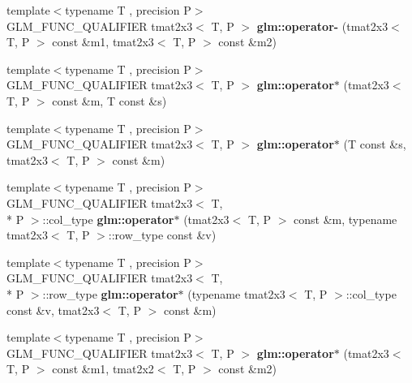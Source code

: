 \begin{DoxyCompactItemize}
\item 
\hypertarget{namespaceglm_a2a06e2f9118332e9be75b7d6e9b7810f}{{\footnotesize template$<$typename T , precision P$>$ }\\G\-L\-M\-\_\-\-F\-U\-N\-C\-\_\-\-Q\-U\-A\-L\-I\-F\-I\-E\-R tmat2x3$<$ T, P $>$ {\bfseries glm\-::operator-\/} (tmat2x3$<$ T, P $>$ const \&m1, tmat2x3$<$ T, P $>$ const \&m2)}\label{namespaceglm_a2a06e2f9118332e9be75b7d6e9b7810f}

\item 
\hypertarget{namespaceglm_a1654f3586768d3ac012abdaf9a13c67f}{{\footnotesize template$<$typename T , precision P$>$ }\\G\-L\-M\-\_\-\-F\-U\-N\-C\-\_\-\-Q\-U\-A\-L\-I\-F\-I\-E\-R tmat2x3$<$ T, P $>$ {\bfseries glm\-::operator$\ast$} (tmat2x3$<$ T, P $>$ const \&m, T const \&s)}\label{namespaceglm_a1654f3586768d3ac012abdaf9a13c67f}

\item 
\hypertarget{namespaceglm_a4b97857dfd756b040b6deaaf24d7a63e}{{\footnotesize template$<$typename T , precision P$>$ }\\G\-L\-M\-\_\-\-F\-U\-N\-C\-\_\-\-Q\-U\-A\-L\-I\-F\-I\-E\-R tmat2x3$<$ T, P $>$ {\bfseries glm\-::operator$\ast$} (T const \&s, tmat2x3$<$ T, P $>$ const \&m)}\label{namespaceglm_a4b97857dfd756b040b6deaaf24d7a63e}

\item 
\hypertarget{namespaceglm_a949617aa8e8cff34aabb9149c9f456af}{{\footnotesize template$<$typename T , precision P$>$ }\\G\-L\-M\-\_\-\-F\-U\-N\-C\-\_\-\-Q\-U\-A\-L\-I\-F\-I\-E\-R tmat2x3$<$ T, \\*
P $>$\-::col\-\_\-type {\bfseries glm\-::operator$\ast$} (tmat2x3$<$ T, P $>$ const \&m, typename tmat2x3$<$ T, P $>$\-::row\-\_\-type const \&v)}\label{namespaceglm_a949617aa8e8cff34aabb9149c9f456af}

\item 
\hypertarget{namespaceglm_a5286d44cdb2c44dafa52fae5b84655ea}{{\footnotesize template$<$typename T , precision P$>$ }\\G\-L\-M\-\_\-\-F\-U\-N\-C\-\_\-\-Q\-U\-A\-L\-I\-F\-I\-E\-R tmat2x3$<$ T, \\*
P $>$\-::row\-\_\-type {\bfseries glm\-::operator$\ast$} (typename tmat2x3$<$ T, P $>$\-::col\-\_\-type const \&v, tmat2x3$<$ T, P $>$ const \&m)}\label{namespaceglm_a5286d44cdb2c44dafa52fae5b84655ea}

\item 
\hypertarget{namespaceglm_abf88e6226fe06c50efc4632326d0b5d6}{{\footnotesize template$<$typename T , precision P$>$ }\\G\-L\-M\-\_\-\-F\-U\-N\-C\-\_\-\-Q\-U\-A\-L\-I\-F\-I\-E\-R tmat2x3$<$ T, P $>$ {\bfseries glm\-::operator$\ast$} (tmat2x3$<$ T, P $>$ const \&m1, tmat2x2$<$ T, P $>$ const \&m2)}\label{namespaceglm_abf88e6226fe06c50efc4632326d0b5d6}


\end{DoxyCompactItemize}
